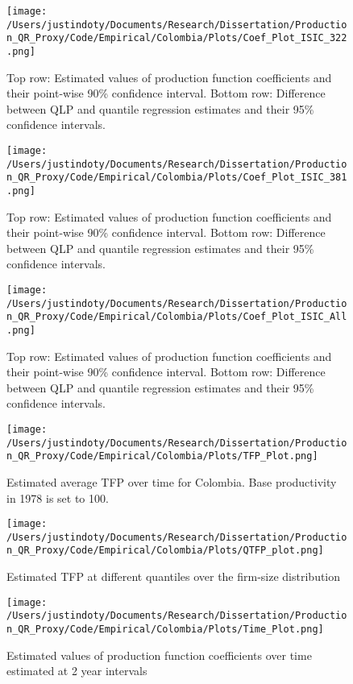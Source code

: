 \documentclass[11pt]{article}
\begin{document}
\begin{figure}[H]
\centering
\texttt{[image: /Users/justindoty/Documents/Research/Dissertation/Production\_QR\_Proxy/Code/Empirical/Colombia/Plots/Coef\_Plot\_ISIC\_322.png]}
\caption{Top row: Estimated values of production function coefficients and their point-wise 90\% confidence interval. Bottom row: Difference between QLP and quantile regression estimates and their 95\% confidence intervals.}
\end{figure}

\begin{figure}[H]
\centering
\texttt{[image: /Users/justindoty/Documents/Research/Dissertation/Production\_QR\_Proxy/Code/Empirical/Colombia/Plots/Coef\_Plot\_ISIC\_381.png]}
\caption{Top row: Estimated values of production function coefficients and their point-wise 90\% confidence interval. Bottom row: Difference between QLP and quantile regression estimates and their 95\% confidence intervals.}
\end{figure}

\begin{figure}[H]
\centering
\texttt{[image: /Users/justindoty/Documents/Research/Dissertation/Production\_QR\_Proxy/Code/Empirical/Colombia/Plots/Coef\_Plot\_ISIC\_All.png]}
\caption{Top row: Estimated values of production function coefficients and their point-wise 90\% confidence interval. Bottom row: Difference between QLP and quantile regression estimates and their 95\% confidence intervals.}
\end{figure}

\begin{figure}[H]
\centering
\texttt{[image: /Users/justindoty/Documents/Research/Dissertation/Production\_QR\_Proxy/Code/Empirical/Colombia/Plots/TFP\_Plot.png]}
\caption{Estimated average TFP over time for Colombia. Base productivity in 1978 is set to 100.}
\end{figure}

\begin{figure}[H]
\centering
\texttt{[image: /Users/justindoty/Documents/Research/Dissertation/Production\_QR\_Proxy/Code/Empirical/Colombia/Plots/QTFP\_plot.png]}
\caption{Estimated TFP at different quantiles over the firm-size distribution}
\end{figure}


\begin{figure}[H]
\centering
\texttt{[image: /Users/justindoty/Documents/Research/Dissertation/Production\_QR\_Proxy/Code/Empirical/Colombia/Plots/Time\_Plot.png]}
\caption{Estimated values of production function coefficients over time estimated at 2 year intervals}
\end{figure}
\end{document}
